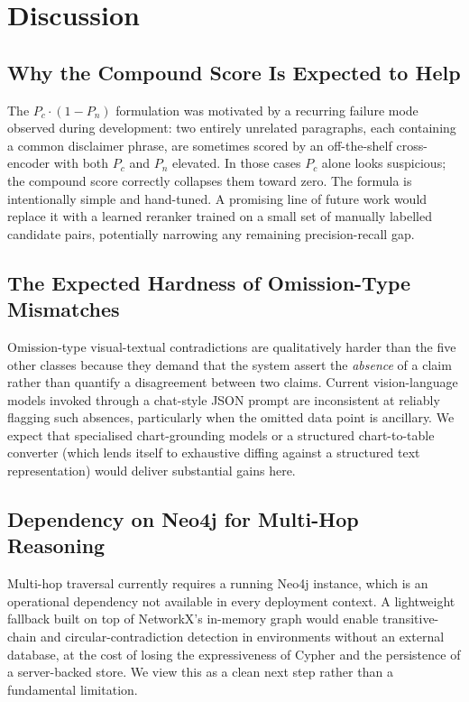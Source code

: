 \documentclass[conference]{IEEEtran}
\begin{document}
\section{Discussion}\label{sec:discussion}
\subsection{Why the Compound Score Is Expected to Help}
The $P_c \cdot (1 - P_n)$ formulation was motivated by a recurring failure mode observed during development: two entirely unrelated paragraphs, each containing a common disclaimer phrase, are sometimes scored by an off-the-shelf cross-encoder with both $P_c$ and $P_n$ elevated. In those cases $P_c$ alone looks suspicious; the compound score correctly collapses them toward zero. The formula is intentionally simple and hand-tuned. A promising line of future work would replace it with a learned reranker trained on a small set of manually labelled candidate pairs, potentially narrowing any remaining precision-recall gap.
\subsection{The Expected Hardness of Omission-Type Mismatches}
Omission-type visual-textual contradictions are qualitatively harder than the five other classes because they demand that the system assert the \emph{absence} of a claim rather than quantify a disagreement between two claims. Current vision-language models invoked through a chat-style JSON prompt are inconsistent at reliably flagging such absences, particularly when the omitted data point is ancillary. We expect that specialised chart-grounding models or a structured chart-to-table converter (which lends itself to exhaustive diffing against a structured text representation) would deliver substantial gains here.
\subsection{Dependency on Neo4j for Multi-Hop Reasoning}
Multi-hop traversal currently requires a running Neo4j instance, which is an operational dependency not available in every deployment context. A lightweight fallback built on top of NetworkX's in-memory graph would enable transitive-chain and circular-contradiction detection in environments without an external database, at the cost of losing the expressiveness of Cypher and the persistence of a server-backed store. We view this as a clean next step rather than a fundamental limitation.
\end{document}
